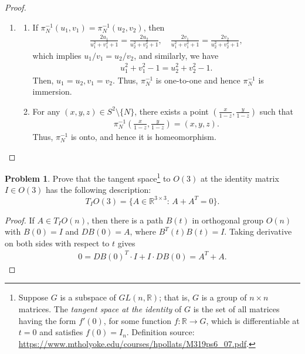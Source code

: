 \documentclass[11pt]{article}
\theoremstyle{definition}
\newtheorem{problem}{Problem}
\theoremstyle{definition}
\begin{document}
\begin{proof}
\begin{enumerate}[label=(\alph*)]
    \item \begin{enumerate}[label=\arabic*)]
        \item If $\pi^{-1}_N(u_1,v_1) = \pi^{-1}_N(u_2, v_2)$, then
        \begin{align*}
            \frac{2u_1}{u_1^2+v_1^2+1} = \frac{2u_2}{u_2^2+v_2^2+1},\quad \frac{2v_1}{u_1^2+v_1^2+1} = \frac{2v_2}{u_2^2+v_2^2+1},
        \end{align*}
        which implies $u_1/v_1 = u_2/v_2$, and similarly, we have
        \begin{align*}
            u_1^2+v_1^2-1 = u_2^2+v_2^2-1.
        \end{align*}
        Then, $u_1 = u_2, v_1 = v_2$. Thus, $\pi^{-1}_N$ is one-to-one and hence $\pi^{-1}_N$ is immersion.
        
        \item For any $(x,y,z) \in S^2 \setminus \{N\}$, there exists a point $\left(\frac{x}{1-z}, \frac{y}{1-z}\right)$ such that 
        \begin{align*}
            \pi^{-1}_N \left(\frac{x}{1-z}, \frac{y}{1-z}\right) = (x,y,z).
        \end{align*}
        Thus, $\pi^{-1}_N$ is onto, and hence it is homeomorphism.
    \end{enumerate}
\end{enumerate}
\end{proof}


\medskip

\begin{problem}
Prove that the tangent space\footnote{Suppose $G$ is a subspace of $GL(n, \mathbb{R})$; that is, $G$ is a group of $n \times n$ matrices. The {\em tangent space at the identity} of $G$ is the set of all matrices having the form $f'(0)$, for some function $f: \mathbb{R} \to G$, which is differentiable at $t = 0$ and satisfies $f(0) = I_n$. Definition source: \url{https://www.mtholyoke.edu/courses/hpollats/M319ps6_07.pdf}.} to $O(3)$ at the identity matrix $I \in O(3)$ has the following description:
$$T_I O(3)=\{A\in \mathbb{R}^{3\times 3}:\, A+A^T=0\}.$$
\end{problem}
\begin{proof}
If $A \in T_I O(n)$, then there is a path $B(t)$ in orthogonal group $O(n)$ with $B(0) = I$ and $DB(0) = A$, where $B^T(t)B(t) = I$\cite{3}. Taking derivative on both sides with respect to $t$ gives 
\begin{align*}
    0 = DB(0)^T \cdot I + I \cdot DB(0) = A^T + A.
\end{align*}
\end{proof}
\end{document}
